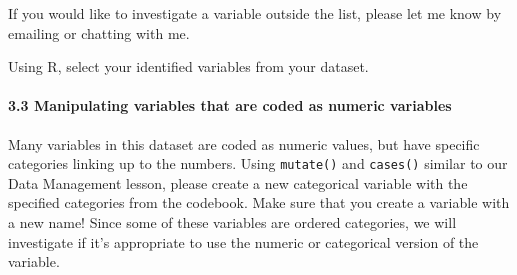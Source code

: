 \documentclass[
  letterpaper,
  DIV=11,
  numbers=noendperiod]{scrartcl}
\let\oldparagraph\paragraph
\renewcommand{\paragraph}[1]{\oldparagraph{#1}\mbox{}}
\begin{document}
If you would like to investigate a variable outside the list, please let
me know by emailing or chatting with me.

\begin{tcolorbox}[enhanced jigsaw, colframe=quarto-callout-important-color-frame, arc=.35mm, colbacktitle=quarto-callout-important-color!10!white, bottomrule=.15mm, left=2mm, breakable, opacitybacktitle=0.6, rightrule=.15mm, opacityback=0, bottomtitle=1mm, coltitle=black, leftrule=.75mm, toptitle=1mm, titlerule=0mm, title=\textcolor{quarto-callout-important-color}{\faExclamation}\hspace{0.5em}{Task}, toprule=.15mm, colback=white]

Using R, select your identified variables from your dataset.

\end{tcolorbox}

\hypertarget{manipulating-variables-that-are-coded-as-numeric-variables}{%
\paragraph{3.3 Manipulating variables that are coded as numeric
variables}\label{manipulating-variables-that-are-coded-as-numeric-variables}}

Many variables in this dataset are coded as numeric values, but have
specific categories linking up to the numbers. Using \texttt{mutate()}
and \texttt{cases()} similar to our Data Management lesson, please
create a new categorical variable with the specified categories from the
codebook. Make sure that you create a variable with a new name! Since
some of these variables are ordered categories, we will investigate if
it's appropriate to use the numeric or categorical version of the
variable.
\end{document}
